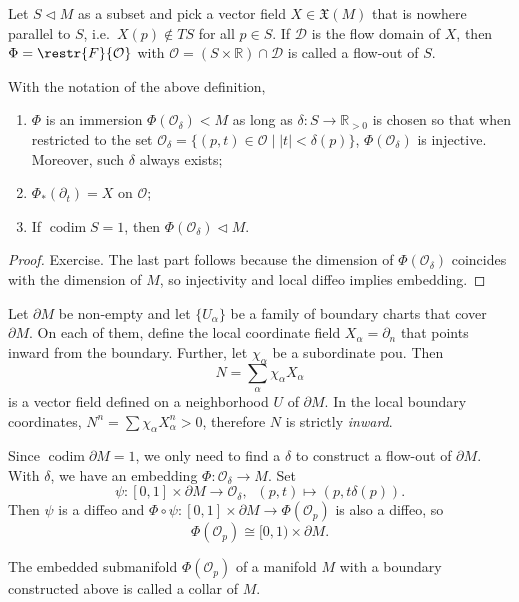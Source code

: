 \documentclass[english,letterpaper]{article}%
\numberwithin{equation}{section}
\numberwithin{figure}{section}
\numberwithin{table}{section}
\theoremstyle{definition}
\theoremstyle{definition}
\theoremstyle{definition}
\theoremstyle{plain}
\theoremstyle{plain}
\theoremstyle{plain}
\theoremstyle{plain}
\theoremstyle{remark}
\theoremstyle{remark}
\DeclareMathOperator{\codim}{codim}
\newcommand{\fX}{\mathfrak{X}}
\newcommand{\sub}{\vartriangleleft}
\begin{document}
\begin{defn}
Let $S\sub M$ as a subset and pick a vector field $X\in\fX(M)$ that is nowhere parallel to $S$, i.e.\ $X(p)\notin TS$ for all $p\in S$. If $\mathcal{D}$ is the flow domain of $X$, then $\Phi=\restr{F}{\mathcal{O}}$ with $\mathcal{O}=(S\times\mathbb{R})\cap \mathcal{D}$ is called a flow-out of $S$.
\end{defn}

\begin{thm}
With the notation of the above definition,
\begin{enumerate}
    \item $\Phi$ is an immersion $\Phi(\mathcal{O}_\delta)<M$ as long as $\delta:S\to \mathbb{R}_{>0}$ is chosen so that when restricted to the set $\mathcal{O}_\delta=\{(p,t)\in\mathcal{O}\mid |t|<\delta(p)\}$, $\Phi(\mathcal{O}_\delta)$ is injective. Moreover, such $\delta$ always exists;
    \item $\Phi_\ast (\partial_t)=X$ on $\mathcal{O}$;
    \item If $\codim S=1$, then $\Phi(\mathcal{O}_\delta)\sub M$.
\end{enumerate}
\end{thm}
\begin{proof}
Exercise. The last part follows because the dimension of $\Phi(\mathcal{O}_\delta)$ coincides with the dimension of $M$, so injectivity and local diffeo implies embedding.
\end{proof}

Let $\partial M$ be non-empty and let $\{U_\alpha\}$ be a family of boundary charts that cover $\partial M$. On each of them, define the local coordinate field $X_\alpha=\partial_n$ that points inward from the boundary. Further, let $\chi_\alpha$ be a subordinate \gls{pou}. Then 
\[N=\sum_\alpha \chi_\alpha X_\alpha\]
is a vector field defined on a neighborhood $U$ of $\partial M$. In the local boundary coordinates, $N^n=\sum \chi_\alpha X_\alpha^n>0$, therefore $N$ is strictly \emph{inward}.

Since $\codim \partial M=1$, we only need to find a $\delta$ to construct a flow-out of $\partial M$. With $\delta$, we have an embedding $\Phi:\mathcal{O}_\delta\to M$. Set 
\[\psi:[0,1]\times\partial M\to\mathcal{O}_\delta,\;\; (p,t)\mapsto (p,t\delta(p)).\]
Then $\psi$ is a diffeo and $\Phi\circ\psi:[0,1]\times\partial M\to \Phi(\mathcal{O}_p)$ is also a diffeo, so
\[\Phi(\mathcal{O}_p)\cong [0,1)\times\partial M.\]

\begin{defn}[Collar]
The embedded submanifold $\Phi(\mathcal{O}_p)$ of a manifold $M$ with a boundary constructed above is called a collar of $M$.
\end{defn}
\end{document}
